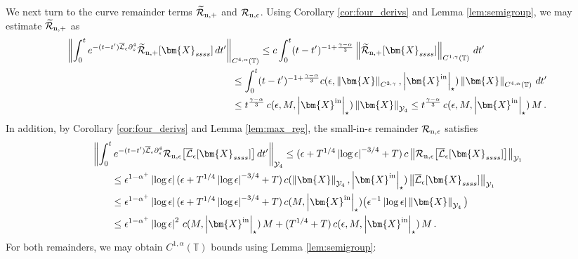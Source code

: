 \documentclass[11pt,reqno]{amsart}
\newcommand{\T}{\mathbb{T}}
\newcommand{\X}{\bm{X}}
\newcommand{\p}{\partial}
\newcommand{\abs}[1]{\left\lvert #1 \right\rvert}
\newcommand{\norm}[1]{\left\lVert #1 \right\rVert}
\newcommand{\wt}[1]{\widetilde{#1}}
\newcommand{\mc}[1]{\mathcal{#1}}
\theoremstyle{definition}
\begin{document}
We next turn to the curve remainder terms $\wt{\mc{R}}_{\rm n,+}$ and $\mc{R}_{\rm n,\epsilon}$. Using Corollary \ref{cor:four_derivs} and Lemma \ref{lem:semigroup}, we may estimate $\wt{\mc{R}}_{\rm n,+}$ as
\begin{equation}
\begin{aligned}
  \norm{\int_0^t e^{-(t-t')\overline{\mc{L}}_\epsilon\p_s^4}\wt{\mc{R}}_{\rm n,+}[\X_{ssss}]\,dt'}_{C^{4,\alpha}(\T)}
  &\le c\int_0^t (t-t')^{-1+\frac{\gamma-\alpha}{3}}\norm{\wt{\mc{R}}_{\rm n,+}[\X_{ssss}]}_{C^{1,\gamma}(\T)}\,dt' \\
  &\hspace{-1cm}\le \int_0^t (t-t')^{-1+\frac{\gamma-\alpha}{3}}c(\epsilon,\norm{\X}_{C^{3,\gamma}},\abs{\X^{\rm in}}_\star)\norm{\X}_{C^{4,\alpha}(\T)}\,dt' \\
  &\hspace{-1cm}\le t^{\frac{\gamma-\alpha}{3}}\,c(\epsilon,M,\abs{\X^{\rm in}}_\star)\norm{\X}_{\mc{Y}_4}
  \le t^{\frac{\gamma-\alpha}{3}}\,c(\epsilon,M,\abs{\X^{\rm in}}_\star)\,M\,.
\end{aligned}
\end{equation}
%
%
In addition, by Corollary \ref{cor:four_derivs} and Lemma \ref{lem:max_reg}, the small-in-$\epsilon$ remainder $\mc{R}_{\rm n,\epsilon}$ satisfies 
\begin{equation}
\begin{aligned}
  &\norm{\int_0^t e^{-(t-t')\overline{\mc{L}}_\epsilon\p_s^4}\mc{R}_{\rm n,\epsilon}\big[\overline{\mc{L}}_\epsilon[\X_{ssss}]\big]\,dt'}_{\mc{Y}_4}
  \le (\epsilon+T^{1/4}\abs{\log\epsilon}^{-3/4}+T) \,c\norm{\mc{R}_{\rm n,\epsilon}\big[\overline{\mc{L}}_\epsilon[\X_{ssss}]\big]}_{\mc{Y}_1} \\
  &\qquad \le \epsilon^{1-\alpha^+}\abs{\log\epsilon}(\epsilon+T^{1/4}\abs{\log\epsilon}^{-3/4}+T)\,c(\norm{\X}_{\mc{Y}_4},\abs{\X^{\rm in}}_\star)\norm{\overline{\mc{L}}_\epsilon[\X_{ssss}]}_{\mc{Y}_1}\\
  &\qquad \le \epsilon^{1-\alpha^+}\abs{\log\epsilon}(\epsilon+T^{1/4}\abs{\log\epsilon}^{-3/4}+T)\,c(M,\abs{\X^{\rm in}}_\star)\big(\epsilon^{-1}\abs{\log\epsilon}\norm{\X}_{\mc{Y}_4} \big)\\
  &\qquad \le \epsilon^{1-\alpha^+}\abs{\log\epsilon}^2\,c(M,\abs{\X^{\rm in}}_\star)\,M +(T^{1/4}+T)\,c(\epsilon,M,\abs{\X^{\rm in}}_\star)\,M\,.
\end{aligned}
\end{equation}
For both remainders, we may obtain $C^{1,\alpha}(\T)$ bounds using Lemma \ref{lem:semigroup}:
\end{document}
